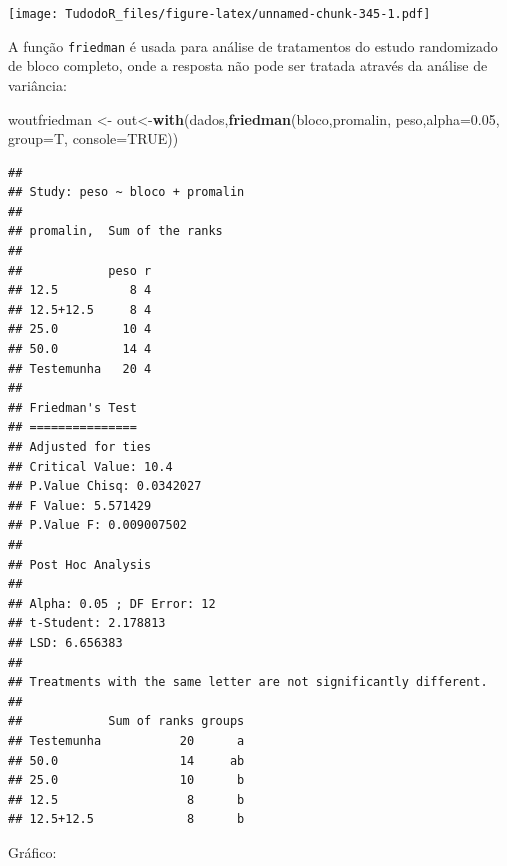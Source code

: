 \documentclass[
]{book}
\newenvironment{Shaded}{\begin{snugshade}}{\end{snugshade}}
\newcommand{\DataTypeTok}[1]{\textcolor[rgb]{0.13,0.29,0.53}{#1}}
\newcommand{\DecValTok}[1]{\textcolor[rgb]{0.00,0.00,0.81}{#1}}
\newcommand{\FloatTok}[1]{\textcolor[rgb]{0.00,0.00,0.81}{#1}}
\newcommand{\KeywordTok}[1]{\textcolor[rgb]{0.13,0.29,0.53}{\textbf{#1}}}
\newcommand{\NormalTok}[1]{#1}
\newcommand{\OperatorTok}[1]{\textcolor[rgb]{0.81,0.36,0.00}{\textbf{#1}}}
\newcommand{\OtherTok}[1]{\textcolor[rgb]{0.56,0.35,0.01}{#1}}
\newcommand{\StringTok}[1]{\textcolor[rgb]{0.31,0.60,0.02}{#1}}
\begin{document}
\texttt{[image: TudodoR\_files/figure-latex/unnamed-chunk-345-1.pdf]}

A função \texttt{friedman} é usada para análise de tratamentos do estudo randomizado
de bloco completo, onde a resposta não pode ser tratada através da análise de variância:

\begin{Shaded}
\begin{Highlighting}[]
\NormalTok{woutfriedman <-}\StringTok{ }\NormalTok{out<-}\KeywordTok{with}\NormalTok{(dados,}\KeywordTok{friedman}\NormalTok{(bloco,promalin, peso,}\DataTypeTok{alpha=}\FloatTok{0.05}\NormalTok{, }\DataTypeTok{group=}\NormalTok{T,}
  \DataTypeTok{console=}\OtherTok{TRUE}\NormalTok{))}
\end{Highlighting}
\end{Shaded}

\begin{verbatim}
## 
## Study: peso ~ bloco + promalin 
## 
## promalin,  Sum of the ranks
## 
##            peso r
## 12.5          8 4
## 12.5+12.5     8 4
## 25.0         10 4
## 50.0         14 4
## Testemunha   20 4
## 
## Friedman's Test
## ===============
## Adjusted for ties
## Critical Value: 10.4
## P.Value Chisq: 0.0342027
## F Value: 5.571429
## P.Value F: 0.009007502 
## 
## Post Hoc Analysis
## 
## Alpha: 0.05 ; DF Error: 12
## t-Student: 2.178813
## LSD: 6.656383 
## 
## Treatments with the same letter are not significantly different.
## 
##            Sum of ranks groups
## Testemunha           20      a
## 50.0                 14     ab
## 25.0                 10      b
## 12.5                  8      b
## 12.5+12.5             8      b
\end{verbatim}

Gráfico:

\begin{Shaded}
\end{Shaded}
\end{document}
